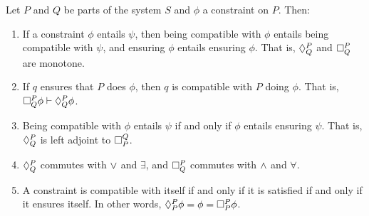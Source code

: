     \begin{prop} \label{Things:prop:compatible.and.ensures} Let $P$ and $Q$ be parts of the system $S$ and $\phi$ a constraint on $P$. Then:
    \begin{enumerate}
        \item If a constraint $\phi$ entails $\psi$, then being compatible with $\phi$ entails being compatible with $\psi$, and ensuring $\phi$ entails ensuring $\phi$. That is, $\compat{P}{Q}$ and $\ensure{P}{Q}$ are monotone.
        \item If $q$ ensures that $P$ does $\phi$, then $q$ is compatible with $P$ doing $\phi$. That is, $\ensure{P}{Q}\phi \vdash \compat{P}{Q}\phi$.
        \item Being compatible with $\phi$ entails $\psi$ if and only if $\phi$ entails ensuring $\psi$. That is, $\compat{P}{Q}$ is left adjoint to $\ensure{Q}{P}$.
        \item $\compat{P}{Q}$ commutes with $\join$ and $\exists$, and $\ensure{P}{Q}$ commutes with $\meet$ and $\forall$.
        \item A constraint is compatible with itself if and only if it is satisfied if and only if it ensures itself. In other words, $\compat{P}{P}\phi = \phi = \ensure{P}{P}\phi$.

    \end{enumerate}
    \end{prop}
